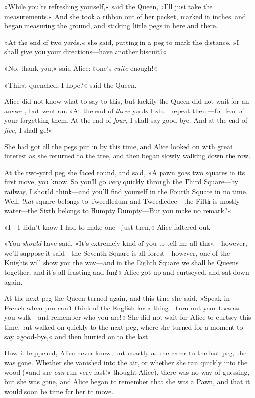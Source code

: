»While you're refreshing yourself,« said the Queen, »I'll just take the measurements.« And she took a ribbon out of her pocket, marked in inches, and began measuring the ground, and sticking little pegs in here and there.

»At the end of two yards,« she said, putting in a peg to mark the distance, »I shall give you your directions—have another biscuit?«

»No, thank you,« said Alice: »one's \textit{quite} enough!«

»Thirst quenched, I hope?« said the Queen.

Alice did not know what to say to this, but luckily the Queen did not wait for an answer, but went on. »At the end of \textit{three} yards I shall repeat them—for fear of your forgetting them. At the end of \textit{four,} I shall say good-bye. And at the end of \textit{five,} I shall go!«

She had got all the pegs put in by this time, and Alice looked on with great interest as she returned to the tree, and then began slowly walking down the row.

At the two-yard peg she faced round, and said, »A pawn goes two squares in its first move, you know. So you'll go \textit{very} quickly through the Third Square—by railway, I should think—and you'll find yourself in the Fourth Square in no time. Well, \textit{that} square belongs to Tweedledum and Tweedledee—the Fifth is mostly water—the Sixth belongs to Humpty Dumpty—But you make no remark?«

»I—I didn't know I had to make one—just then,« Alice faltered out.

»You \textit{should} have said, »It's extremely kind of you to tell me all this«—however, we'll suppose it said—the Seventh Square is all forest—however, one of the Knights will show you the way—and in the Eighth Square we shall be Queens together, and it's all feasting and fun!« Alice got up and curtseyed, and sat down again.

At the next peg the Queen turned again, and this time she said, »Speak in French when you can't think of the English for a thing—turn out your toes as you walk—and remember who you are!« She did not wait for Alice to curtsey this time, but walked on quickly to the next peg, where she turned for a moment to say »good-bye,« and then hurried on to the last.

How it happened, Alice never knew, but exactly as she came to the last peg, she was gone. Whether she vanished into the air, or whether she ran quickly into the wood (»and she \textit{can} run very fast!« thought Alice), there was no way of guessing, but she was gone, and Alice began to remember that she was a Pawn, and that it would soon be time for her to move.